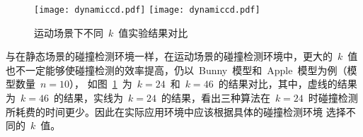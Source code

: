 \begin{figure}[htb] 
\centering
{}
{  
   \texttt{[image: dynamiccd.pdf]}
}
{  
    \texttt{[image: dynamiccd.pdf]}
}
\caption{运动场景下不同~$k$~值实验结果对比}
\label{fig:chart:exp:kdop:kcbp:k24:k46:dynamic}
\end{figure}

与在静态场景的碰撞检测环境一样，在运动场景的碰撞检测环境中，更大的~$k$~值也不一定能够使碰撞检测的效率提高，仍以~Bunny~模型和~Apple~模型为例（模型数量~$n=10$），
如图~\ref{fig:chart:exp:kdop:kcbp:k24:k46:dynamic}~为~$k=24$~和~$k=46$~的结果对比，其中，虚线的结果为~$k=46$~的结果，实线为~$k=24$~的结果，看出三种算法在~$k=24$~时碰撞检测所耗费的时间更少。因此在实际应用环境中应该根据具体的碰撞检测环境
选择不同的~$k$~值。

